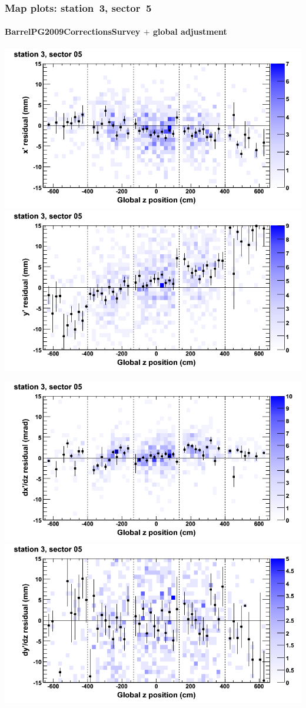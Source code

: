 \documentclass[compress]{beamer}
\begin{document}
\begin{frame}
\frametitle{Map plots: station~3, sector~5}
\framesubtitle{BarrelPG2009CorrectionsSurvey $+$ global adjustment}
\includegraphics[width=0.5\linewidth]{mapplots_re01/DTvsz_st3sec05_x.png}
\includegraphics[width=0.5\linewidth]{mapplots_re01/DTvsz_st3sec05_y.png}

\includegraphics[width=0.5\linewidth]{mapplots_re01/DTvsz_st3sec05_dxdz.png}
\includegraphics[width=0.5\linewidth]{mapplots_re01/DTvsz_st3sec05_dydz.png}
\end{frame}
\end{document}
